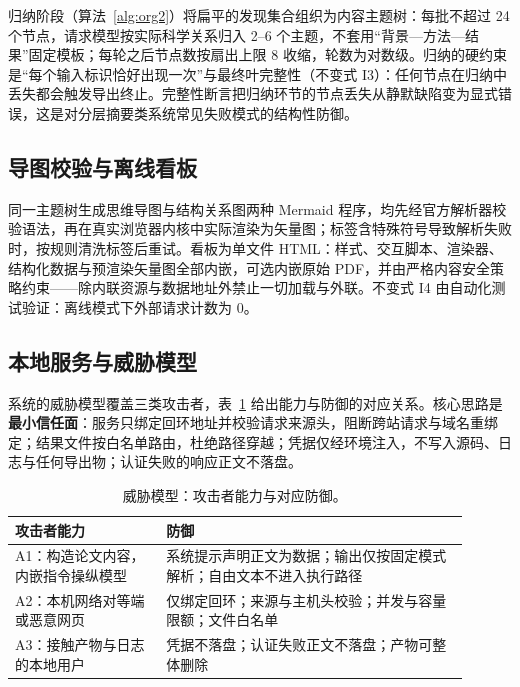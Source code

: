 \documentclass[11pt]{article}
\begin{document}
归纳阶段（算法~\ref{alg:org2}）将扁平的发现集合组织为内容主题树：每批不超过 24 个节点，请求模型按实际科学关系归入 2--6 个主题，不套用“背景—方法—结果”固定模板；每轮之后节点数按扇出上限 8 收缩，轮数为对数级。归纳的硬约束是“每个输入标识恰好出现一次”与最终叶完整性（不变式 I3）：任何节点在归纳中丢失都会触发导出终止。完整性断言把归纳环节的节点丢失从静默缺陷变为显式错误，这是对分层摘要类系统常见失败模式的结构性防御。

\subsection{导图校验与离线看板}

同一主题树生成思维导图与结构关系图两种 Mermaid 程序\citep{mermaid}，均先经官方解析器校验语法，再在真实浏览器内核中实际渲染为矢量图；标签含特殊符号导致解析失败时，按规则清洗标签后重试。看板为单文件 HTML：样式、交互脚本、渲染器、结构化数据与预渲染矢量图全部内嵌，可选内嵌原始 PDF，并由严格内容安全策略约束——除内联资源与数据地址外禁止一切加载与外联。不变式 I4 由自动化测试验证：离线模式下外部请求计数为 0。

\subsection{本地服务与威胁模型}\label{sec:security}

系统的威胁模型覆盖三类攻击者，表~\ref{tab:threat} 给出能力与防御的对应关系。核心思路是\textbf{最小信任面}：服务只绑定回环地址并校验请求来源头，阻断跨站请求与域名重绑定；结果文件按白名单路由，杜绝路径穿越；凭据仅经环境注入，不写入源码、日志与任何导出物；认证失败的响应正文不落盘。

\begin{table}[t]
\centering
\small
\setlength{\tabcolsep}{3pt}
\begin{tabular}{@{}p{0.30\linewidth}p{0.60\linewidth}@{}}
\toprule
\textbf{攻击者能力} & \textbf{防御} \\
\midrule
A1：构造论文内容，内嵌指令操纵模型 & 系统提示声明正文为数据；输出仅按固定模式解析；自由文本不进入执行路径 \\
A2：本机网络对等端或恶意网页 & 仅绑定回环；来源与主机头校验；并发与容量限额；文件白名单 \\
A3：接触产物与日志的本地用户 & 凭据不落盘；认证失败正文不落盘；产物可整体删除 \\
\bottomrule
\end{tabular}
\caption{威胁模型：攻击者能力与对应防御。}
\label{tab:threat}
\end{table}
\end{document}
